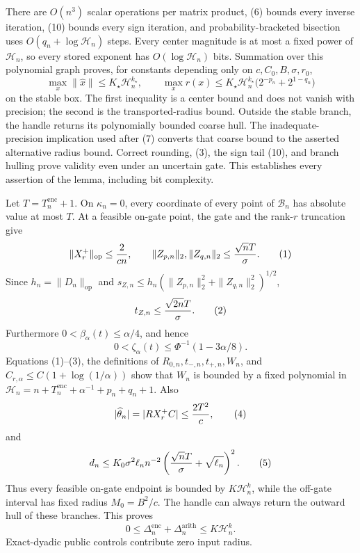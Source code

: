 There are \(O(n^3)\) scalar operations per matrix product, (6) bounds every
inverse iteration, (10) bounds every sign iteration, and probability-bracketed
bisection uses \(O(q_n+\log\mathcal H_n)\) steps.  Every center magnitude is
at most a fixed power of \(\mathcal H_n\), so every stored exponent has
\(O(\log\mathcal H_n)\) bits.  Summation over this polynomial graph proves,
for constants depending only on \(c,C_0,B,\sigma,r_0\),
\[
\max_x\|\widehat x\|\le K_\star\mathcal H_n^{k_\star},
\qquad
\max_x r(x)\le K_\star\mathcal H_n^{k_\star}
\bigl(2^{-p_n}+2^{1-q_n}\bigr)                                      \tag{18}
\]
on the stable box.  The first inequality is a center bound and does not vanish
with precision; the second is the transported-radius bound.  Outside the stable
branch, the handle returns its polynomially bounded coarse hull.  The
inadequate-precision implication used after (7) converts that coarse bound to
the asserted alternative radius bound.  Correct rounding, (3), the sign tail
(10), and branch hulling prove validity even under an uncertain gate.  This
establishes every assertion of the lemma, including bit complexity.

Let \(T=T_n^{\mathrm{enc}}+1\).  On \(\kappa_n=0\), every coordinate of every
point of \(\mathcal B_n\) has absolute value at most \(T\).  At a feasible
on-gate point, the gate and the rank-\(r\) truncation give
\[
\|X_r^+\|_{
\mathrm{op}}\le {2\over cn},
\qquad
\|Z_{p,n}\|_2,\|Z_{q,n}\|_2\le {\sqrt nT\over\sigma}.               \tag{1}
\]
Since \(h_n=\|D_n\|_{
\mathrm{op}}\) and
\(s_{Z,n}\le h_n(\|Z_{p,n}\|_2^2+\|Z_{q,n}\|_2^2)^{1/2}\),
\[
t_{Z,n}\le {\sqrt{2n}T\over\sigma}.                                 \tag{2}
\]
Furthermore \(0<\beta_\alpha(t)\le\alpha/4\), and hence
\[
0<\zeta_\alpha(t)\le \Phi^{-1}(1-3\alpha/8).                        \tag{3}
\]
Equations (1)--(3), the definitions of \(R_{0,n},t_{-,n},t_{+,n},W_n\), and
\(C_{r,\alpha}\le C(1+\log(1/\alpha))\) show that \(W_n\) is bounded by a
fixed polynomial in
\(\mathcal H_n=n+T_n^{\mathrm{enc}}+\alpha^{-1}+p_n+q_n+1\).
Also
\[
|\widehat\theta_n|=|RX_r^+C|\le {2T^2\over c},                       \tag{4}
\]
and
\[
d_n\le K_0\sigma^2\ell_n n^{-2}
\left({\sqrt nT\over\sigma}+\sqrt{\ell_n}\right)^2.                 \tag{5}
\]
Thus every feasible on-gate endpoint is bounded by
\(K\mathcal H_n^k\), while the off-gate interval has fixed radius
\(M_0=B^2/c\).  The handle can always return the outward hull of these branches.
This proves
\[
0\le\Delta_n^{\mathrm{enc}}+\Delta_n^{\mathrm{arith}}
\le K\mathcal H_n^k.                                                  \tag{6}
\]
Exact-dyadic public controls contribute zero input radius.

